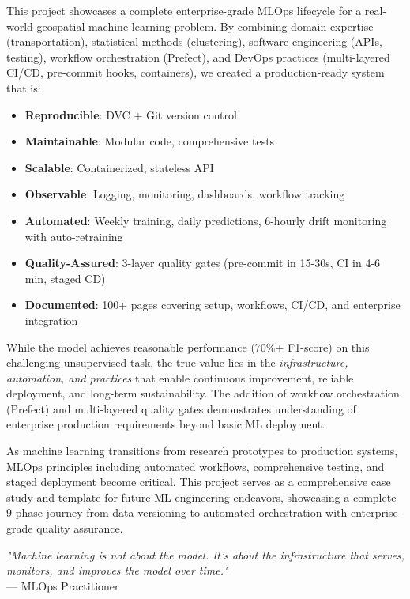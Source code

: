 This project showcases a complete enterprise-grade MLOps lifecycle for a real-world geospatial machine learning problem. By combining domain expertise (transportation), statistical methods (clustering), software engineering (APIs, testing), workflow orchestration (Prefect), and DevOps practices (multi-layered CI/CD, pre-commit hooks, containers), we created a production-ready system that is:

\begin{itemize}
    \item \textbf{Reproducible}: DVC + Git version control
    \item \textbf{Maintainable}: Modular code, comprehensive tests
    \item \textbf{Scalable}: Containerized, stateless API
    \item \textbf{Observable}: Logging, monitoring, dashboards, workflow tracking
    \item \textbf{Automated}: Weekly training, daily predictions, 6-hourly drift monitoring with auto-retraining
    \item \textbf{Quality-Assured}: 3-layer quality gates (pre-commit in 15-30s, CI in 4-6 min, staged CD)
    \item \textbf{Documented}: 100+ pages covering setup, workflows, CI/CD, and enterprise integration
\end{itemize}

While the model achieves reasonable performance (70\%+ F1-score) on this challenging unsupervised task, the true value lies in the \textit{infrastructure, automation, and practices} that enable continuous improvement, reliable deployment, and long-term sustainability. The addition of workflow orchestration (Prefect) and multi-layered quality gates demonstrates understanding of enterprise production requirements beyond basic ML deployment.

As machine learning transitions from research prototypes to production systems, MLOps principles including automated workflows, comprehensive testing, and staged deployment become critical. This project serves as a comprehensive case study and template for future ML engineering endeavors, showcasing a complete 9-phase journey from data versioning to automated orchestration with enterprise-grade quality assurance.


\vspace{1cm}

\begin{center}
\textit{"Machine learning is not about the model. It's about the infrastructure that serves, monitors, and improves the model over time."} \\
\vspace{0.3cm}
--- MLOps Practitioner
\end{center}
